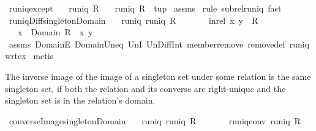 \begin{isabellebody}
\ runiq{\isacharunderscore}except{\isacharcolon}\isanewline
\ \ \ {\isachardoublequoteopen}runiq\ R{\isachardoublequoteclose}\isanewline
\ \ \ {\isachardoublequoteopen}runiq\ {\isacharparenleft}R\ {\isacharminus}\ {\isacharbraceleft}tup{\isacharbraceright}{\isacharparenright}{\isachardoublequoteclose}\isanewline
%
\isadelimproof
%
\endisadelimproof
%
\isatagproof
{}\isamarkupfalse%
\ assms\isanewline
{}\isamarkupfalse%
\ {\isacharparenleft}rule\ subrel{\isacharunderscore}runiq{\isacharparenright}\ fast%
\endisatagproof
{\isafoldproof}%
%
\isadelimproof
\isanewline
%
\endisadelimproof
\isanewline
{}\isamarkupfalse%
\ runiq{\isacharunderscore}Diff{\isacharunderscore}singleton{\isacharunderscore}Domain{\isacharcolon}\isanewline
\ \ \ runiq{\isacharcolon}\ {\isachardoublequoteopen}runiq\ R{\isachardoublequoteclose}\isanewline
\ \ \ \ \ \ \ in{\isacharunderscore}rel{\isacharcolon}\ {\isachardoublequoteopen}{\isacharparenleft}x{\isacharcomma}\ y{\isacharparenright}\ {\isasymin}\ R{\isachardoublequoteclose}\isanewline
\ \ \ {\isachardoublequoteopen}x\ {\isasymnotin}\ Domain\ {\isacharparenleft}R\ {\isacharminus}\ {\isacharbraceleft}{\isacharparenleft}x{\isacharcomma}\ y{\isacharparenright}{\isacharbraceright}{\isacharparenright}{\isachardoublequoteclose}\isanewline
%
\isadelimproof
\isanewline
%
\endisadelimproof
%
\isatagproof
{}\isamarkupfalse%
\ assms\ DomainE\ Domain{\isacharunderscore}Un{\isacharunderscore}eq\ UnI{}\ Un{\isacharunderscore}Diff{\isacharunderscore}Int\ member{\isacharunderscore}remove\ remove{\isacharunderscore}def\ runiq{\isacharunderscore}wrt{\isacharunderscore}ex{}\isanewline
{}\isamarkupfalse%
\ metis%
\endisatagproof
{\isafoldproof}%
%
\isadelimproof
%
\endisadelimproof
%
\isamarkuptrue%
%
\begin{isamarkuptext}%
The inverse image of the image of a singleton set under some relation is the same
  singleton set, if both the relation and its converse are right-unique and the singleton set
  is in the relation's domain.%
\end{isamarkuptext}%
\isamarkuptrue%
\isamarkupfalse%
\ converse{\isacharunderscore}Image{\isacharunderscore}singleton{\isacharunderscore}Domain{\isacharcolon}\isanewline
\ \ \ runiq{\isacharcolon}\ {\isachardoublequoteopen}runiq\ R{\isachardoublequoteclose}\isanewline
\ \ \ \ \ \ \ runiq{\isacharunderscore}conv{\isacharcolon}\ {\isachardoublequoteopen}runiq\ {\isacharparenleft}R{\isasyminverse}{\isacharparenright}{\isachardoublequoteclose}\isanewline

\end{isabellebody}
